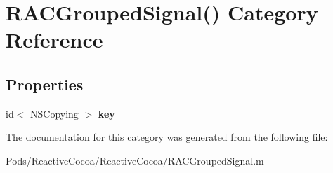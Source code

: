 \hypertarget{category_r_a_c_grouped_signal_07_08}{}\section{R\+A\+C\+Grouped\+Signal() Category Reference}
\label{category_r_a_c_grouped_signal_07_08}
\subsection*{Properties}
\begin{DoxyCompactItemize}
\item 
\mbox{\label{category_r_a_c_grouped_signal_07_08_aac0da663408225a3a1a89a3a1ed2168b}} 
id$<$ N\+S\+Copying $>$ {\bfseries key}
\end{DoxyCompactItemize}


The documentation for this category was generated from the following file\+:\begin{DoxyCompactItemize}
\item 
Pods/\+Reactive\+Cocoa/\+Reactive\+Cocoa/R\+A\+C\+Grouped\+Signal.\+m\end{DoxyCompactItemize}
